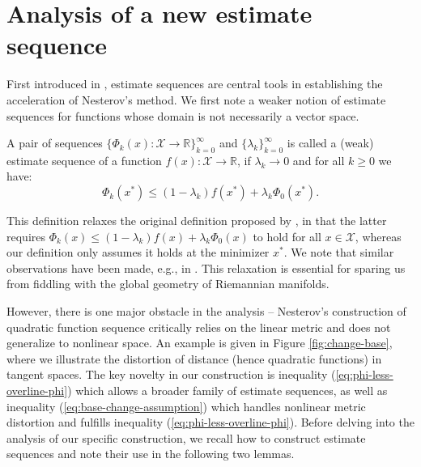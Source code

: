 \section{Analysis of a new estimate sequence} \label{sec:general-analysis}
First introduced in \citep{nesterov1983method}, estimate sequences are central tools in establishing the acceleration of Nesterov's method. We first note a weaker notion of estimate sequences for functions whose domain is not necessarily a vector space.
\begin{definition} \label{def:weak-estimate-sequence}
	A pair of sequences $\{\Phi_{k}(x):\mathcal{X}\to\mathbb{R}\}_{k=0}^{\infty}$ and $\{\lambda_k\}_{k=0}^{\infty}$ is called a (weak) estimate sequence of a function $f(x):\mathcal{X}\to\mathbb{R}$, if $\lambda_k\to 0$ and for all $k\ge 0$ we have:
	\begin{equation} \label{eq:weak-estimate-sequence-definition}
	\Phi_k(x^*) \le (1-\lambda_k)f(x^*) + \lambda_k\Phi_0(x^*).
	\end{equation}
\end{definition}
This definition relaxes the original definition proposed by \citet[def. 2.2.1]{nesterov2004introductory}, in that the latter requires $\Phi_k(x) \le (1-\lambda_k)f(x) + \lambda_k\Phi_0(x)$ to hold for all $x\in\mathcal{X}$, whereas our definition only assumes it holds at the minimizer $x^*$. We note that similar observations have been made, e.g., in \citep{carmon2017convex}. This relaxation is essential for sparing us from fiddling with the global geometry of Riemannian manifolds.
%


However, there is one major obstacle in the analysis -- Nesterov's construction of quadratic function sequence critically relies on the linear metric and does not generalize to nonlinear space. An example is given in Figure \ref{fig:change-base}, where we illustrate the distortion of distance (hence quadratic functions) in tangent spaces. The key novelty in our construction is inequality (\ref{eq:phi-less-overline-phi}) which allows a broader family of estimate sequences, as well as inequality (\ref{eq:base-change-assumption}) which handles nonlinear metric distortion and fulfills inequality (\ref{eq:phi-less-overline-phi}). Before delving into the analysis of our specific construction, we recall how to construct estimate sequences and note their use in the following two lemmas.

